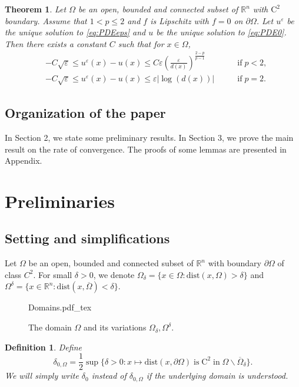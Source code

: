 \documentclass[12pt,reqno]{amsart}
\numberwithin{figure}{section}
\theoremstyle{plain}
\newtheorem{thm}{Theorem}[section]
\newtheorem{defn}{Definition}
\theoremstyle{remark}
\numberwithin{equation}{section}
\newcommand{\R}{\mathbb{R}}
\newcommand{\rmC}{\mathrm{C}}
\newcommand{\incfig}[1]{%
    \def\svgwidth{\columnwidth}
    {#1.pdf_tex}
}
\begin{document}
\begin{thm}\label{main_thm2} Let $\Omega$ be an open, bounded and connected subset of $\R^n$ with $\mathrm{C}^2$ boundary. Assume that $1 < p\leq 2$ and $f$ is Lipschitz with $f = 0$ on $\partial\Omega$. Let $u^\varepsilon$ be the unique solution to \eqref{eq:PDEeps} and $u$ be the unique solution to \eqref{eq:PDE0}. Then there exists a constant $C$ such that for $x\in \Omega$,
\begin{align*}
    &-C\sqrt{\varepsilon}\leq  u^\varepsilon(x) - u(x)\leq  C\varepsilon \left(\frac{\varepsilon}{d(x)}\right)^{\frac{2-p}{p-1}} &\qquad\text{if}\; p < 2,\\
    &-C\sqrt{\varepsilon}\leq  u^\varepsilon(x) - u(x)\leq  \varepsilon|\log(d(x))| &\qquad\text{if}\; p = 2.
\end{align*}
\end{thm}



\subsection*{Organization of the paper} In Section 2, we state some preliminary results. In Section 3, we prove the main result on the rate of convergence. The proofs of some lemmas are presented in Appendix.

\section{Preliminaries}\label{sec:prelim} 
\subsection{Setting and simplifications} Let $\Omega$ be an open, bounded and connected subset of $\mathbb{R}^n$ with boundary $\partial\Omega$ of class $C^2$. For small $\delta>0$, we denote $\Omega_\delta = \{x\in \Omega: \mathrm{dist}(x,\Omega) > \delta\}$ and $\Omega^\delta = \{x\in \mathbb{R}^n: \mathrm{dist}(x,\overline{\Omega}) < \delta\}$. 
\begin{figure}[ht]
    \centering
    \def\svgwidth{0.35\columnwidth}
    {Domains.pdf_tex}
    \caption{The domain $\Omega$ and its variations $\Omega_\delta, \Omega^\delta$.}
    \label{fig:Domains}
\end{figure}

\begin{defn} Define
\begin{equation}\label{def:delta_0}
    \delta_{0,\Omega} =\frac{1}{2}\sup \big\{ \delta > 0: x\mapsto\mathrm{dist}(x,\partial\Omega)\;\text{is}\;\rmC^2\;\text{in}\;\Omega\backslash\overline{\Omega}_{\delta} \big\}.
\end{equation}
We will simply write $\delta_0$ instead of $\delta_{0,\Omega}$ if the underlying domain is understood.
\end{defn}
\end{document}

